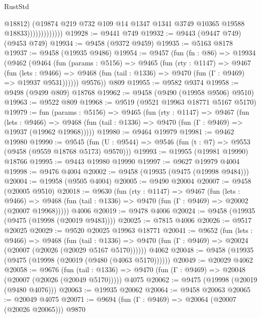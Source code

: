 \begin{lexlean}{RustStd}
\begin{coremodule}
                              @18812)
                            (@19874
                              @219
                              @732
                              @109
                              @14
                              @1347
                              @1341
                              @3749
                              @10365
                              @19588
                              @18833)))))))))))))
@19928 := @9441 @749
@19932 := @9443 (@9447 @749) (@9453 @749)
@19934 := @9458 (@9372 @9459)
@19935 := @5163 @8178
@19937 := @9458 (@19935 @9486)
@19954 := @9457
    (fun (fn : @86) =>
    @19934
      (@9462
        (@9464
          (fun (params : @5156) =>
          @9465
            (fun (rty : @1147) =>
            @9467
              (fun (lets : @9466) =>
              @9468 (fun (tail : @1336) => @9470 (fun (Γ : @9469) => @19937 @9531))))))
        @9576))
    @809
@19955 := @9582 @9374
@19958 := @9498 (@9499 @809) @18768
@19962 := @9458 (@9490 (@19958 @9506) @9510)
@19963 := @9522 @809
@19968 := @9519 (@9521 @19963 @18771 @5167 @5170)
@19979 := fun (params : @5156) =>
  @9465
    (fun (rty : @1147) =>
    @9467
      (fun (lets : @9466) =>
      @9468 (fun (tail : @1336) => @9470 (fun (Γ : @9469) => @19937 (@19962 @19968)))))
@19980 := @9464 @19979
@19981 := @9462 @19980
@19990 := @9545
    (fun (U : @9544) => @9546 (fun (t : @7) => @9553 (@9458 (@9559 @18768 @5173) @9570)))
@19993 := @19955 (@19981 @19990) @18766
@19995 := @9443 @19980 @19990
@19997 := @9627 @19979 @4004
@19998 := @9476 @4004
@20002 := @9458 (@19935 (@9475 (@19998 @9484)))
@20004 := @19958 (@9505 @4004)
@20005 := @9490 @20004
@20007 := @9458 (@20005 @9510)
@20018 := @9630
    (fun (rty : @1147) =>
    @9467
      (fun (lets : @9466) =>
      @9468 (fun (tail : @1336) => @9470 (fun (Γ : @9469) => @20002 (@20007 @19968)))))
    @4006
@20019 := @9478 @4006
@20024 := @9458 (@19935 (@9475 (@19998 (@20019 @9483))))
@20025 := @7815 @4006
@20026 := @9517 @20025
@20029 := @9520 @20025 @19963 @18771
@20041 := @9652
    (fun (lets : @9466) =>
    @9468
      (fun (tail : @1336) =>
      @9470 (fun (Γ : @9469) => @20024 (@20007 (@20026 (@20029 @5167 @5170))))))
    @4062
@20048 := @9458 (@19935 (@9475 (@19998 (@20019 (@9480 (@4063 @5170))))))
@20049 := @20029 @4062
@20058 := @9676
    (fun (tail : @1336) => @9470 (fun (Γ : @9469) => @20048 (@20007 (@20026 (@20049 @5170)))))
    @4075
@20062 := @9475 (@19998 (@20019 (@9480 @4076)))
@20063 := @19935 @20062
@20064 := @9458 @20063
@20065 := @20049 @4075
@20071 := @9694 (fun (Γ : @9469) => @20064 (@20007 (@20026 @20065))) @9870

\end{coremodule}
\end{lexlean}

